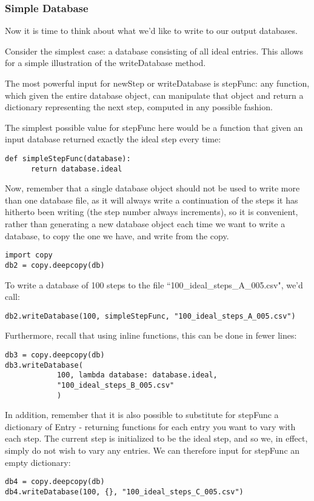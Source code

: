 \subsubsection{Simple Database}
Now it is time to think about what we'd like to write to our output 
databases. 

Consider the simplest case: a database consisting of all ideal entries. 
This allows for a simple illustration of the writeDatabase method.

The most powerful input for newStep or writeDatabase is stepFunc: any
function, which given the entire database object, can manipulate that
object and return a dictionary representing the next step, computed
in any possible fashion.

The simplest possible value for stepFunc here would be a function that 
given an input database returned exactly the ideal step every time:
\begin{verbatim}
def simpleStepFunc(database):
      return database.ideal
\end{verbatim}
Now, remember that a single database object should not be used to write 
more than one database file, as it will always write a continuation of the 
steps it has hitherto been writing (the step number always increments), so 
it is convenient, rather than generating a new database object each time we 
want to write a database, to copy the one we have, and write from the copy.
\begin{verbatim}
import copy
db2 = copy.deepcopy(db)
\end{verbatim}
To write a database of 100 steps to the file ``100\_ideal\_steps\_A\_005.csv", 
we'd call:
\begin{verbatim}
db2.writeDatabase(100, simpleStepFunc, "100_ideal_steps_A_005.csv")
\end{verbatim}
Furthermore, recall that using inline functions, this can be done in 
fewer lines:
\begin{verbatim}
db3 = copy.deepcopy(db)
db3.writeDatabase(
            100, lambda database: database.ideal, 
            "100_ideal_steps_B_005.csv"
            )
\end{verbatim}

In addition, remember that it is also possible to substitute for stepFunc a 
dictionary of Entry - returning functions for each entry you want to vary 
with each step. The current step is initialized to be the ideal step, and 
so we, in effect, simply do not wish to vary any entries. We can therefore 
input for stepFunc an empty dictionary:
\begin{verbatim}
db4 = copy.deepcopy(db)
db4.writeDatabase(100, {}, "100_ideal_steps_C_005.csv")
\end{verbatim}


